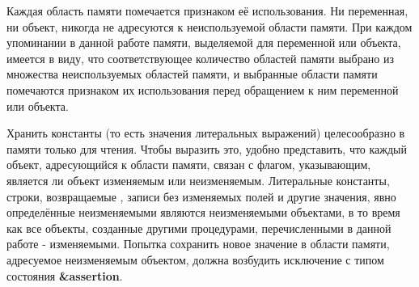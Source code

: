 Каждая область памяти помечается признаком её использования. Ни переменная, ни объект, никогда
не адресуются к неиспользуемой области памяти. При каждом упоминании в данной работе памяти,
выделяемой для переменной или объекта, имеется в виду, что соответствующее количество областей
памяти выбрано из множества неиспользуемых областей памяти, и выбранные области памяти
помечаются признаком их использования перед обращением к ним переменной или объекта.

Хранить константы (то есть значения литеральных выражений) целесообразно в
памяти только для чтения. Чтобы выразить это, удобно представить, что каждый объект,
адресующийся к области памяти, связан с флагом, указывающим, является ли объект
изменяемым или неизменяемым. Литеральные константы, строки,
возвращаемые {\bfseries{}}, записи без изменяемых полей и другие значения,
явно определённые неизменяемыми являются неизменяемыми объектами, в то время как все объекты,
созданные другими процедурами, перечисленными в данной работе - изменяемыми. Попытка сохранить
новое значение в области памяти, адресуемое неизменяемым объектом, должна возбудить исключение с
типом состояния {\bfseries\cf\&assertion}.\vspace{-2mm}

